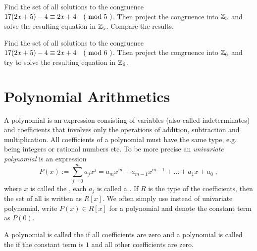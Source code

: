 \begin{exercise}
Find the set of all solutions to the congruence $17(2x+5)-4 \equiv 2x+4 \quad \text{( mod } 5 \text{ )}$. Then project the congruence into $\mathbb{Z}_5$ and solve the resulting equation in $\mathbb{Z}_5$. Compare the results. 
\end{exercise}
\begin{exercise}
Find the set of all solutions to the congruence $17(2x+5)-4 \equiv 2x+4 \quad \text{( mod } 6 \text{ )}$. Then project the congruence into $\mathbb{Z}_6$ and try to solve the resulting equation in $\mathbb{Z}_6$.
\end{exercise}
\section{Polynomial Arithmetics}
A polynomial is an expression consisting of variables (also called indeterminates) and coefficients that involves only the operations of addition, subtraction and multiplication. All coefficients of a polynomial must have the same type, e.g. being integers or rational numbers etc. To be more precise an \textit{univariate polynomial} is an expression
\begin{equation}
P(x) := \sum _{j = 0} ^{m}{a} _{j}{x} ^{j} ={a} _{m}x^m +{a} _{m-1} x^{m-1} + \dots + a_1 x + a_0 \;,
\end{equation}
where $x$ is called the , each $ a_j$ is called a . If $R$ is the type of the coefficients, then the set of all  is written as $R[x]$. We often simply use  instead of univariate polynomial, write $ P (x) \in R[x]$ for a polynomial and denote the constant term as $ P(0)$. 

A polynomial is called the  if all coefficients are zero and a polynomial is called the  if the constant term is $1$ and all other coefficients are zero.

